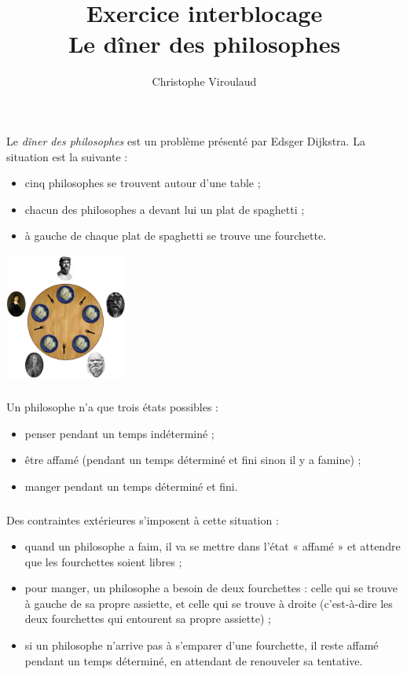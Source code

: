 \documentclass[svgnames,11pt]{beamer}
\author[]{Christophe Viroulaud}
\title{Exercice interblocage\\Le dîner des philosophes}
\date{\framebox{\textbf{Archi 09}}}
\institute{Terminale - NSI}
\begin{document}
\begin{frame}
\titlepage
\end{frame}
\begin{frame}
    \frametitle{}

    Le \emph{dîner des philosophes} est un problème présenté par  Edsger Dijkstra.
La situation est la suivante :
\begin{itemize}
\item cinq philosophes se trouvent autour d'une table ;
\item chacun des philosophes a devant lui un plat de spaghetti ;
\item à gauche de chaque plat de spaghetti se trouve une fourchette.
\end{itemize}
\begin{center}
\centering
\includegraphics[width=4cm]{ressources/philo.png}
\label{IMG}
\end{center}
\end{frame}
\begin{frame}
    \frametitle{}

    Un philosophe n'a que trois états possibles :
\begin{itemize}
\item penser pendant un temps indéterminé ;
\item être affamé (pendant un temps déterminé et fini sinon il y a famine) ;
\item manger pendant un temps déterminé et fini.
\end{itemize}

\end{frame}
\begin{frame}
    \frametitle{}

    Des contraintes extérieures s'imposent à cette situation :
\begin{itemize}
\item quand un philosophe a faim, il va se mettre dans l'état « affamé » et attendre que les fourchettes soient libres ;
\item pour manger, un philosophe a besoin de deux fourchettes : celle qui se trouve à gauche de sa propre assiette, et celle qui se trouve à droite (c'est-à-dire les deux fourchettes qui entourent sa propre assiette) ;
\item si un philosophe n'arrive pas à s'emparer d'une fourchette, il reste affamé pendant un temps déterminé, en attendant de renouveler sa tentative.
\end{itemize}

\end{frame}
\end{document}
